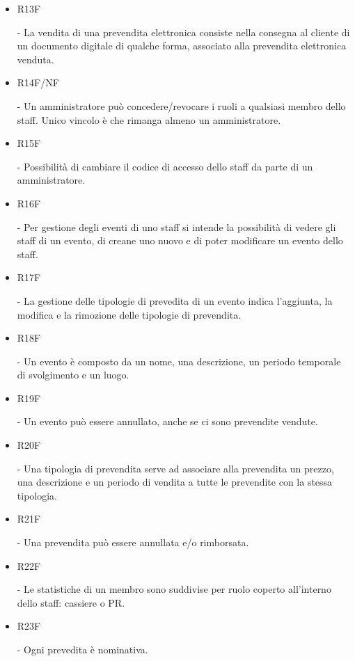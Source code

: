 \documentclass[a4paper]{article}
\begin{document}
\begin{itemize}
	\item \hypertarget{R13F}{R13F} - La vendita di una prevendita elettronica consiste nella consegna al cliente di un documento digitale di qualche forma, associato alla prevendita elettronica venduta.
	
	\item \hypertarget{R14F/NF}{R14F/NF} - Un amministratore può concedere/revocare i ruoli a qualsiasi membro dello staff. Unico vincolo è che rimanga almeno un amministratore.
	\item \hypertarget{R15F}{R15F} - Possibilità di cambiare il codice di accesso dello staff da parte di un amministratore.
	   
	\item \hypertarget{R16F}{R16F} - Per gestione degli eventi di uno staff si intende la possibilità di vedere gli staff di un evento, di creane uno nuovo e di poter modificare un evento dello staff.
		
	\item \hypertarget{R17F}{R17F} - La gestione delle tipologie di prevedita di un evento indica l'aggiunta, la modifica e la rimozione delle tipologie di prevendita.
	
	\item \hypertarget{R18F}{R18F} - Un evento è composto da un nome, una descrizione, un periodo temporale di svolgimento e un luogo. 
	\item \hypertarget{R19F}{R19F} - Un evento può essere annullato, anche se ci sono prevendite vendute.
	
	\item \hypertarget{R20F}{R20F} - Una tipologia di prevendita serve ad associare alla prevendita un prezzo, una descrizione e un periodo di vendita a tutte le prevendite con la stessa tipologia.

	\item \hypertarget{R21F}{R21F} - Una prevendita può essere annullata e/o rimborsata. 
	
	\item \hypertarget{R22F}{R22F} - Le statistiche di un membro sono suddivise per ruolo coperto all'interno dello staff: cassiere o PR.
	
	\item \hypertarget{R23F}{R23F} - Ogni prevedita è nominativa.
	
	

\end{itemize}
\end{document}
